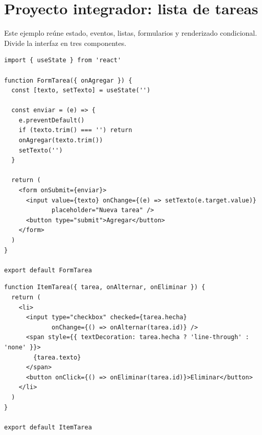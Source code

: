 \documentclass[11pt,a4paper]{article}
\begin{document}
\section{Proyecto integrador: lista de tareas}

Este ejemplo reúne estado, eventos, listas, formularios y renderizado condicional. Divide la interfaz en tres componentes.

\begin{lstlisting}[language=JSX,title={\small\ttfamily src/components/FormTarea.jsx}]
import { useState } from 'react'

function FormTarea({ onAgregar }) {
  const [texto, setTexto] = useState('')

  const enviar = (e) => {
    e.preventDefault()
    if (texto.trim() === '') return
    onAgregar(texto.trim())
    setTexto('')
  }

  return (
    <form onSubmit={enviar}>
      <input value={texto} onChange={(e) => setTexto(e.target.value)}
             placeholder="Nueva tarea" />
      <button type="submit">Agregar</button>
    </form>
  )
}

export default FormTarea
\end{lstlisting}

\begin{lstlisting}[language=JSX,title={\small\ttfamily src/components/ItemTarea.jsx}]
function ItemTarea({ tarea, onAlternar, onEliminar }) {
  return (
    <li>
      <input type="checkbox" checked={tarea.hecha}
             onChange={() => onAlternar(tarea.id)} />
      <span style={{ textDecoration: tarea.hecha ? 'line-through' : 'none' }}>
        {tarea.texto}
      </span>
      <button onClick={() => onEliminar(tarea.id)}>Eliminar</button>
    </li>
  )
}

export default ItemTarea
\end{lstlisting}
\end{document}
